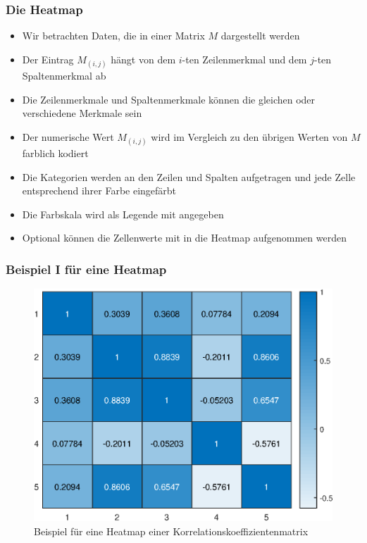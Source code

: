 \begin{frame}
\frametitle{Die Heatmap}
\begin{itemize}[<+->]
\item Wir betrachten Daten, die in einer Matrix $M$ dargestellt werden
\item Der Eintrag $M_{(i,j)}$ hängt von dem $i$-ten Zeilenmerkmal und dem $j$-ten Spaltenmerkmal ab
\item Die Zeilenmerkmale und Spaltenmerkmale können die gleichen oder verschiedene Merkmale sein
\item Der numerische Wert $M_{(i,j)}$ wird im Vergleich zu den übrigen Werten von $M$ farblich kodiert
\item Die Kategorien werden an den Zeilen und Spalten aufgetragen und jede Zelle entsprechend ihrer Farbe eingefärbt
\item Die Farbskala wird als Legende mit angegeben
\item Optional können die Zellenwerte mit in die Heatmap aufgenommen werden
\end{itemize}
\end{frame}
\begin{frame}
\frametitle{Beispiel I für eine Heatmap}
\begin{figure}[hbtp]
\centering
\includegraphics[scale=0.55]{images/plot_heatmap_corr.eps}
\caption{Beispiel für eine Heatmap einer Korrelationskoeffizientenmatrix}
\end{figure}
\end{frame}
